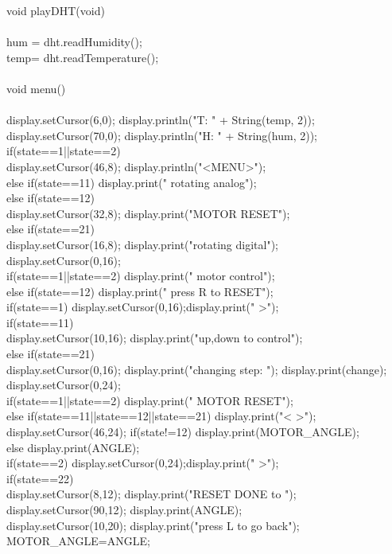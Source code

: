 void playDHT(void)\\
{\\
	hum = dht.readHumidity();\\
	temp= dht.readTemperature();\\
}\\
void menu()\\
{\\
	display.setCursor(6,0); display.println("T: " + String(temp, 2));\\
	display.setCursor(70,0); display.println("H: " + String(hum, 2));\\
	if(state==1||state==2) \\
	{display.setCursor(46,8); display.println("<MENU>");}\\
	else if(state==11) display.print("   rotating analog");\\
	else if(state==12)\\
	{display.setCursor(32,8); display.print("MOTOR RESET");}\\
	else if(state==21) \\
	{display.setCursor(16,8); display.print("rotating digital");}\\
	display.setCursor(0,16);\\
	if(state==1||state==2) display.print("   motor control");\\
	else if(state==12) display.print("   press R to RESET");\\
	if(state==1) {display.setCursor(0,16);display.print(" >");}\\
	if(state==11) \\
	{display.setCursor(10,16); display.print("up,down to control");}\\
	else if(state==21)\\
	{display.setCursor(0,16); display.print("changing step: "); display.print(change);}\\
	display.setCursor(0,24);\\
	if(state==1||state==2) display.print("   MOTOR RESET");\\
	else if(state==11||state==12||state==21) {display.print("<                   >"); \\
		display.setCursor(46,24); if(state!=12) display.print(MOTOR\_ANGLE);\\
		else display.print(ANGLE);}\\
	if(state==2) {display.setCursor(0,24);display.print(" >");}\\
	if(state==22)\\
	{  display.setCursor(8,12); display.print("RESET DONE to ");\\
		display.setCursor(90,12); display.print(ANGLE);\\
		display.setCursor(10,20); display.print("press L to go back");\\
		MOTOR\_ANGLE=ANGLE;}\\
}\\

